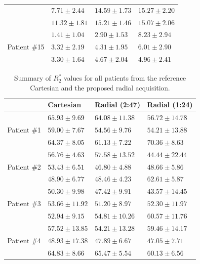 \documentclass[journal,twoside,web]{ieeecolor}
\begin{document}
\begin{table}[h!]
\begin{tabular}{m{} m{} m{} m{}}
		& $ 7.71 \pm 2.44$ & $14.59 \pm 1.73$ & $15.27 \pm 2.20$ \\
		& $11.32 \pm 1.81$ & $15.21 \pm 1.46$ & $15.07 \pm 2.06$ \\
		\hline
		\multirow[t]{3}{*}{Patient \#15}
		& $ 1.41 \pm 1.04$ & $ 2.90 \pm 1.53$ & $ 8.23 \pm 2.94$ \\ %
		& $ 3.32 \pm 2.19$ & $ 4.31 \pm 1.95$ & $ 6.01 \pm 2.90$ \\
		& $ 3.30 \pm 1.64$ & $ 4.67 \pm 2.04$ & $ 4.96 \pm 2.41$ \\
		\bottomrule
	\end{tabular}
\end{table}


\begin{table}[h!]
	\caption{Summary of $R_2^*$ values for all patients from the reference Cartesian and the proposed radial acquisition.}
	\label{TAB:SubjectSTAT_R2S}
	\setlength{\tabcolsep}{3pt}
	\begin{tabular}{m{} m{} m{} m{}}
		\toprule
		& Cartesian & Radial (2:47) & Radial (1:24) \\
		\hline
		\multirow[t]{3}{*}{Patient \#1}   
		& $65.93 \pm 9.69$ & $64.08 \pm 11.38$ & $56.72 \pm 14.78$ \\ %
		& $59.00 \pm 7.67$ & $54.56 \pm  9.76$ & $54.21 \pm 13.88$ \\
		& $64.37 \pm 8.05$ & $61.13 \pm  7.22$ & $70.36 \pm  8.63$ \\
		\hline
		\multirow[t]{3}{*}{Patient \#2}   
		& $56.76 \pm 4.63$ & $57.58 \pm 13.52$ & $44.44 \pm 22.44$ \\ %
        & $53.43 \pm 6.51$ & $46.80 \pm  4.88$ & $48.66 \pm 5.86$ \\
        & $48.90 \pm 6.77$ & $48.46 \pm  4.23$ & $62.61 \pm 5.87$ \\
		\hline
		\multirow[t]{3}{*}{Patient \#3}   
		& $50.30 \pm  9.98$ & $47.42 \pm  9.91$ & $43.57 \pm 14.45$ \\ %
        & $53.66 \pm 11.92$ & $51.20 \pm  8.97$ & $52.30 \pm 11.97$ \\
        & $52.94 \pm  9.15$ & $54.81 \pm 10.26$ & $60.57 \pm 11.76$ \\
		\hline
		\multirow[t]{3}{*}{Patient \#4}   
		& $57.52 \pm 13.85$ & $54.21 \pm 13.28$ & $59.46 \pm 14.17$ \\ %
        & $48.93 \pm 17.38$ & $47.89 \pm 6.67$ & $47.05 \pm 7.71$ \\
        & $64.83 \pm  8.66$ & $65.47 \pm 5.54$ & $60.13 \pm 6.56$ \\

\end{tabular}
\end{table}
\end{document}
